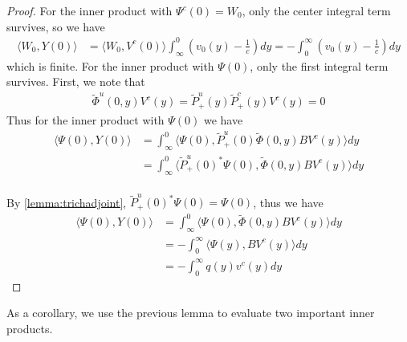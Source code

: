 \documentclass[thesis.tex]{subfiles}
\begin{document}
\begin{lemma}
\begin{proof}
For the inner product with $\Psi^c(0) = W_0$, only the center integral term survives, so we have
\begin{align*}
\langle W_0, Y(0) \rangle
&= \langle W_0, V^c(0) \rangle \int_{\infty}^0 \left(v_0(y) - \frac{1}{c}\right) dy 
= -\int_0^{\infty} \left(v_0(y) - \frac{1}{c}\right) dy 
\end{align*}
which is finite. For the inner product with $\Psi(0)$, only the first integral term survives. First, we note that 
\begin{align*}
\tilde{\Phi}^u(0,y) V^c(y) = \tilde{P}_+^u(y) \tilde{P}_+^c(y)V^c(y) = 0
\end{align*}
Thus for the inner product with $\Psi(0)$ we have
\begin{align*}
\langle \Psi(0), Y(0) \rangle
&= \int_{\infty}^0 \langle \Psi(0), \tilde{P}_+^u(0) \tilde{\Phi}(0,y) B V^c(y) \rangle dy \\
&= \int_{\infty}^0 \langle \tilde{P}_+^u(0)^*\Psi(0), \tilde{\Phi}(0,y) B V^c(y) \rangle dy \\
\end{align*}

By \cref{lemma:trichadjoint}, $\tilde{P}_+^u(0)^*\Psi(0) = \Psi(0)$, thus we have
\begin{align*}
\langle \Psi(0), Y(0) \rangle
&= \int_{\infty}^0 \langle \Psi(0), \tilde{\Phi}(0,y) B V^c(y) \rangle dy \\
&= -\int_0^\infty \langle \Psi(y), B V^c(y) \rangle dy \\
&=-\int_0^\infty q(y) v^c(y) dy
\end{align*}
\end{proof}
\end{lemma}

As a corollary, we use the previous lemma to evaluate two important inner products.
\end{document}
